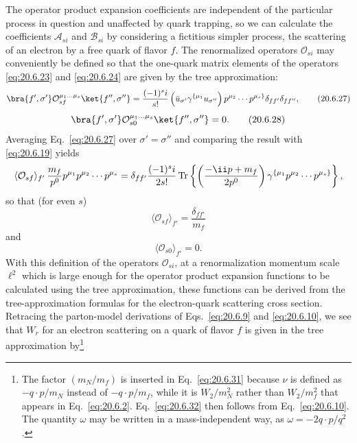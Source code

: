 The operator product expansion coefficients are independent of the particular process in question and unaffected by quark trapping, so we can calculate the coefficients $\mathcal A_{si}$ and $\mathcal B_{si}$ by considering a fictitious simpler process, the scattering of an electron by a free quark of flavor $f$. The renormalized operators $\mathcal O_{si}$ may conveniently be defined so that the one-quark matrix elements of the operators \eqref{eq:20.6.23} and \eqref{eq:20.6.24} are given by the tree approximation:
\begin{equation}
\bra{f',\sigma'}\mathcal O_{sf}^{\mu_1\ldots\mu_s}
\ket{f'',\sigma''}
=
\frac{(-1)^si}{s!}
\left(\bar u_{\sigma'}\gamma^{\{\mu_1}u_{\sigma''}\right)
p^{\mu_2}\cdots p^{\mu_s\}}
\delta_{ff'}\delta_{ff''},
\tag{20.6.27}\label{eq:20.6.27}
\end{equation}
\begin{equation}
\bra{f',\sigma'}\mathcal O_{s0}^{\mu_1\ldots\mu_s}
\ket{f'',\sigma''}=0.
\tag{20.6.28}\label{eq:20.6.28}
\end{equation}
Averaging Eq.~\eqref{eq:20.6.27} over $\sigma'=\sigma''$ and comparing the result with \eqref{eq:20.6.19} yields
\[
\langle\mathcal O_{sf}\rangle_{f'}\,
\frac{m_f}{p^0}p^{\mu_1}p^{\mu_2}\cdots p^{\mu_s}
=
\delta_{ff'}\frac{(-1)^si}{2s!}
\operatorname{Tr}\left\{
\left(\frac{-\ii\sl p+m_f}{2p^0}\right)
\gamma^{\{\mu_1}p^{\mu_2}\cdots p^{\mu_s\}}
\right\},
\]
so that (for even $s$)
\begin{equation}
\langle\mathcal O_{sf}\rangle_{f'}
=\frac{\delta_{ff'}}{m_f}
\tag{20.6.29}\label{eq:20.6.29}
\end{equation}
and
\begin{equation}
\langle\mathcal O_{s0}\rangle_{f'}=0.
\tag{20.6.30}\label{eq:20.6.30}
\end{equation}
With this definition of the operators $\mathcal O_{si}$, at a renormalization momentum scale $\ell^2$ which is large enough for the operator product expansion functions to be calculated using the tree approximation, these functions can be derived from the tree-approximation formulas for the electron-quark scattering cross section. Retracing the parton-model derivations of Eqs.~\eqref{eq:20.6.9} and \eqref{eq:20.6.10}, we see that $W_r$ for an electron scattering on a quark of flavor $f$ is given in the tree approximation by\footnote{The factor $(m_N/m_f)$ is inserted in Eq.~\eqref{eq:20.6.31} because $\nu$ is defined as $-q\cdot p/m_N$ instead of $-q\cdot p/m_f$, while it is $W_2/m_N^2$ rather than $W_2/m_f^2$ that appears in Eq.~\eqref{eq:20.6.2}. Eq.~\eqref{eq:20.6.32} then follows from Eq.~\eqref{eq:20.6.10}. The quantity $\omega$ may be written in a mass-independent way, as $\omega=-2q\cdot p/q^2$.}
